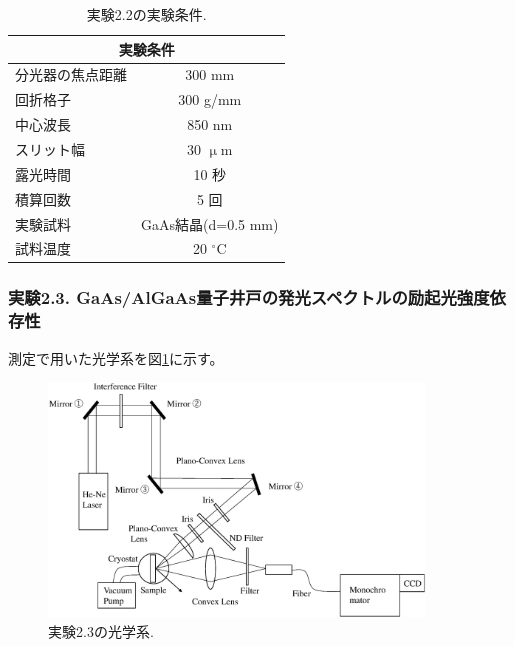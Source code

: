 \documentclass[11pt,a4j]{jsarticle}
\begin{document}
\begin{table}[ht]
 \centering
 \caption{実験2.2の実験条件.}
 \begin{tabular}{lc}\hline
  \multicolumn{2}{c}{実験条件}          \\ \hline
  分光器の焦点距離 & 300 mm             \\
  回折格子         & 300 g/mm           \\
  中心波長         & 850 nm             \\
  スリット幅       & 30 $\upmu$m        \\
  露光時間         & 10 秒              \\
  積算回数         & 5 回               \\
  実験試料         & GaAs結晶(d=0.5 mm) \\
  試料温度         & 20 ${}^\circ$C     \\ \hline
 \end{tabular}
 \label{col_2.2}
\end{table}


\newpage
\subsubsection{実験2.3. GaAs/AlGaAs量子井戸の発光スペクトルの励起光強度依存性}

測定で用いた光学系を図\ref{fig_system4}に示す。

\begin{figure}[h]
 \centering
 \includegraphics[clip,width=10cm]{start_system4.eps}
 \caption{実験2.3の光学系.}
 \label{fig_system4}
\end{figure}
\end{document}
